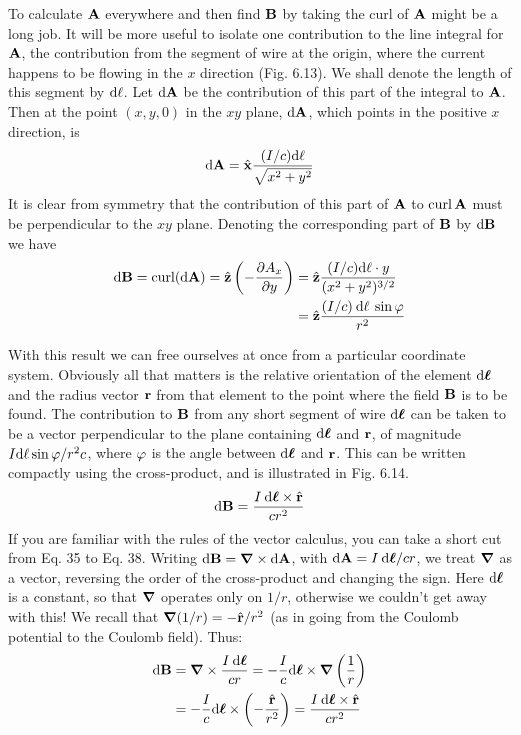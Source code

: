 To calculate $\mathbf{A}$ everywhere and then find $\mathbf{B}$ by taking the curl of $\mathbf{A}$
might be a long job. It will be more useful to isolate one contribution
to the line integral for $\mathbf{A}$, the contribution from the segment of
wire at the origin, where the current happens to be flowing in the
$x$ direction (Fig. 6.13). We shall denote the length of this segment
by $\textup{d} \ell$. Let $\textup{d}\mathbf{A}$ be the contribution of this part of the integral to $\mathbf{A}$.
Then at the point $(x,y,0)$ in the $xy$ plane, $\textup{d}\mathbf{A}$, which points in the
positive $x$ direction, is
\begin{equation}
  \textup{d}\mathbf{A} = \hat{\mathbf{x}} \frac{(I/c)\textup{d}\ell}{\sqrt{x^2+y^2}}
\end{equation}
It is clear from symmetry that the contribution of this part of $\mathbf{A}$ to
$\operatorname{curl} \mathbf{A}$ must be perpendicular to the $xy$ plane. Denoting the corresponding
part of $\mathbf{B}$ by $\textup{d}\mathbf{B}$ we have
\begin{align}
\begin{split}
  \textup{d}\mathbf{B} = \operatorname{curl}(\textup{d}\mathbf{A}) = \hat{\mathbf{z}}\left(-\frac{\partial A_x}{\partial y}\right)
        &= \hat{\mathbf{z}}\frac{(I/c)\textup{d}\ell\cdot y}{(x^2+y^2)^{3/2}} \\
        &= \hat{\mathbf{z}}\frac{(I/c)\:\textup{d}\ell\:\sin\varphi}{r^2} 
\end{split}
\end{align}

With this result we can free ourselves at once from a particular
coordinate system. Obviously all that matters is the relative orientation
of the element $\textup{d}\boldsymbol{\ell}$ and the radius vector $\mathbf{r}$ from that element to
the point where the field $\mathbf{B}$ is to be found. The contribution to $\mathbf{B}$
from any short segment of wire $\textup{d}\boldsymbol{\ell}$ can be taken to be a vector
perpendicular to the plane containing $\textup{d}\boldsymbol{\ell}$ and $\mathbf{r}$, of magnitude
$I \textup{d}\ell \sin \varphi/r^2c$, where $\varphi$ is the angle between $\textup{d}\boldsymbol{\ell}$ and $\mathbf{r}$. This can be
written compactly using the cross-product, and is illustrated in
Fig. 6.14.
\begin{equation}
  \textup{d}\mathbf{B} = \frac{I\:\textup{d}\boldsymbol{\ell}\times \hat{\mathbf{r}}}{cr^2}
\end{equation}
If you are familiar with the rules of the vector calculus, you can take
a short cut from Eq. 35 to Eq. 38. Writing $\textup{d}\mathbf{B} = \boldsymbol{\nabla} \times \textup{d}\mathbf{A}$, with
$\textup{d}\mathbf{A} = I\: \textup{d}\boldsymbol{\ell}/cr$, we treat $\boldsymbol{\nabla}$ as a vector, reversing the order of the 
cross-product and changing the sign. Here $\textup{d}\boldsymbol{\ell}$ is a constant, so that $\boldsymbol{\nabla}$
operates only on $1/r$, otherwise we couldn't get away with this! We
recall that $\boldsymbol{\nabla}( 1 /r) = -\hat{\mathbf{r}}/r^2$ (as in going from the Coulomb potential
to the Coulomb field). Thus:
\begin{align}
\begin{split}
  \textup{d}\mathbf{B} &= \boldsymbol{\nabla}\times \frac{I\:\textup{d}\boldsymbol{\ell}}{cr} = -\frac{I}{c}\textup{d}\boldsymbol{\ell}\times\boldsymbol{\nabla}\left(\frac{1}{r}\right) \\
             &= -\frac{I}{c} \textup{d}\boldsymbol{\ell}\times\left(-\frac{\hat{\mathbf{r}}}{r^2}\right)
                   = \frac{I\:\textup{d}\boldsymbol{\ell}\times\hat{\mathbf{r}}}{cr^2}
\end{split}
\end{align}

